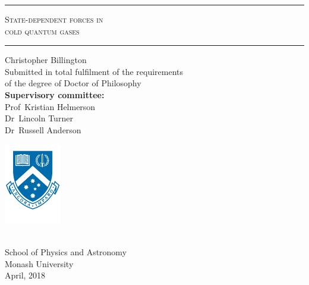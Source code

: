 \begin{titlingpage}
\thispagestyle{empty}
\begin{centering}
\rule{\textwidth}{1pt}\par
\vspace{0.5\baselineskip}
{\HUGE\scshape State-dependent forces in \\ cold quantum gases\\}
\vspace{\baselineskip}
\rule{\textwidth}{1pt}\par
\vfill
{\Huge Christopher Billington}\\
\vfill
\Large Submitted in total fulfilment of the requirements\\
of the degree of Doctor of Philosophy\\
\vspace{\baselineskip}
\textbf{Supervisory committee:}\\
Prof~Kristian Helmerson\\
Dr~Lincoln Turner\\
Dr~Russell Anderson\\
\vfill
\begin{minipage}{3cm}
\centerfloat
\includegraphics[width=2.5cm]{figures/Monash_crest_A4.pdf}
\end{minipage}\\
{\Large School of Physics and Astronomy\\
Monash University\\
\vspace{\baselineskip}
April, 2018}\\
\end{centering}
\draftinfo
\restoregeometry
\end{titlingpage}


\cleardoublepage

\vspace*{\fill}

